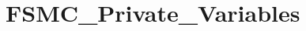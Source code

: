 \hypertarget{group___f_s_m_c___private___variables}{\section{F\-S\-M\-C\-\_\-\-Private\-\_\-\-Variables}
\label{group___f_s_m_c___private___variables}
}
